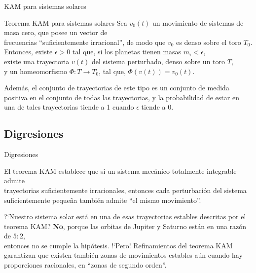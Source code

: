 \documentclass[8pt]{beamer}
\renewcommand{\>}{\rangle}
\newcommand{\<}{\langle}
\begin{document}
\begin{frame}{KAM para sistemas solares}
\vspace{-0.0cm}

\begin{mybox}{Teorema KAM para sistemas solares}
Sea $v_{0}(t)$ un movimiento de sistemas de masa cero, que posee un vector de\\[5pt] frecuencias ``suficientemente irracional'', de modo que $v_{0}$ es denso sobre el toro $T_{0}$.\\[5pt]
Entonces, existe $\epsilon > 0$ tal que, si los planetas tienen masas $m_{i} < \epsilon$,\\[5pt] existe una trayectoria $v(t)$ del sistema perturbado, denso sobre un toro $T$,\\[5pt] y un homeomorfismo $\Phi: T \rightarrow T_{0}$, tal que, $\Phi(v(t))=v_{0}(t)$.
\vspace{0.5cm}

Además, el conjunto de trayectorias de este tipo es un conjunto de medida positiva en el conjunto de todas las trayectorias, y la probabilidad de estar en una de tales trayectorias tiende a 1 cuando $\epsilon$ tiende a 0.
\end{mybox}

\end{frame}

\subsection[Digresiones]{Digresiones}

\begin{frame}{Digresiones}

\begin{mybluebox}{}
El teorema KAM establece que si un sistema mecánico totalmente integrable admite\\[2pt] trayectorias suficientemente irracionales, entonces cada perturbación del sistema\\[2pt] suficientemente pequeña también admite ``el mismo movimiento''. 
\end{mybluebox}
\bigskip

\begin{mybluebox}{?`Nuestro sistema solar está en una de esas trayectorias estables descritas por el teorema KAM?}
\textbf{No}, porque las orbitas de Jupiter y Saturno están en una razón de $5:2$, \\[2pt] entonces no se cumple la hipótesis. !`Pero! Refinamientos del teorema KAM \\[2pt] garantizan que existen también zonas de movimientos estables aún cuando hay \\[2pt]proporciones racionales, en ``zonas de segundo orden''.
\end{mybluebox}
\end{frame}
\end{document}
